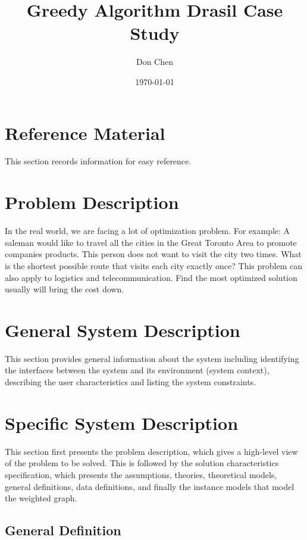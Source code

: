 \documentclass[12pt]{article}
\title{Greedy Algorithm Drasil Case Study}
\author{Don Chen}
\date{\today}
\begin{document}
\tableofcontents

\section{Reference Material}

This section records information for easy reference.

\section{Problem Description}
In the real world, we are facing a lot of optimization problem. For example:
A saleman would like to travel all the cities in the Great Toronto Area to promote companies products.
This person does not want to visit the city two times. What is the shortest possible route that visits 
each city exactly once? This problem can also apply to logistics and telecommunication.
Find the most optimized solution usually will bring the cost down.

\section{General System Description}
This section provides general information about the system including identifying the interfaces between the system 
and its environment (system context), describing the user characteristics and listing the system constraints.

\section{Specific System Description}
This section first presents the problem description, which gives a high-level view of the problem to be solved. 
This is followed by the solution characteristics specification, which presents the assumptions, theories, theoretical 
models, general definitions, data definitions, and finally the instance models that model the weighted graph.

\subsection{General Definition}
\end{document}
